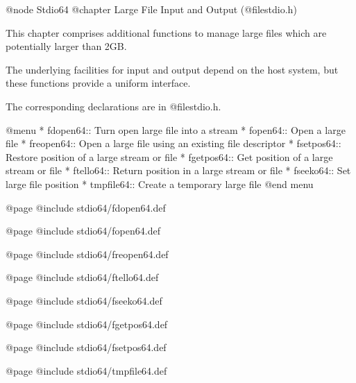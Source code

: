 @node Stdio64
@chapter Large File Input and Output (@file{stdio.h}) 

This chapter comprises additional functions to manage large files which
are potentially larger than 2GB.

The underlying facilities for input and output depend on the host
system, but these functions provide a uniform interface.

The corresponding declarations are in @file{stdio.h}.

@menu
* fdopen64::    Turn open large file into a stream
* fopen64::     Open a large file
* freopen64::   Open a large file using an existing file descriptor
* fsetpos64::   Restore position of a large stream or file
* fgetpos64::   Get position of a large stream or file
* ftello64::    Return position in a large stream or file
* fseeko64::    Set large file position
* tmpfile64::   Create a temporary large file
@end menu 

@page
@include stdio64/fdopen64.def

@page
@include stdio64/fopen64.def

@page
@include stdio64/freopen64.def

@page 
@include stdio64/ftello64.def 

@page
@include stdio64/fseeko64.def

@page
@include stdio64/fgetpos64.def

@page
@include stdio64/fsetpos64.def

@page
@include stdio64/tmpfile64.def

